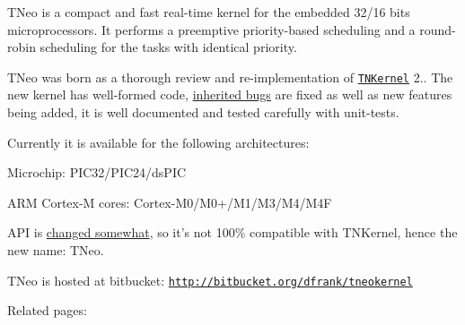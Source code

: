 T\+Neo is a compact and fast real-\/time kernel for the embedded 32/16 bits microprocessors. It performs a preemptive priority-\/based scheduling and a round-\/robin scheduling for the tasks with identical priority.

T\+Neo was born as a thorough review and re-\/implementation of \href{http://tnkernel.com}{\tt T\+N\+Kernel} 2.. The new kernel has well-\/formed code, \hyperlink{why_reimplement_why_reimplement__bugs}{inherited bugs} are fixed as well as new features being added, it is well documented and tested carefully with unit-\/tests.

Currently it is available for the following architectures\+:


\begin{DoxyItemize}
\item Microchip\+: P\+I\+C32/\+P\+I\+C24/ds\+P\+I\+C
\item A\+R\+M Cortex-\/\+M cores\+: Cortex-\/\+M0/\+M0+/\+M1/\+M3/\+M4/\+M4\+F
\end{DoxyItemize}

A\+P\+I is \hyperlink{tnkernel_diff}{changed somewhat}, so it's not 100\% compatible with T\+N\+Kernel, hence the new name\+: T\+Neo.

T\+Neo is hosted at bitbucket\+: \href{http://bitbucket.org/dfrank/tneokernel}{\tt http\+://bitbucket.\+org/dfrank/tneokernel}

Related pages\+:



